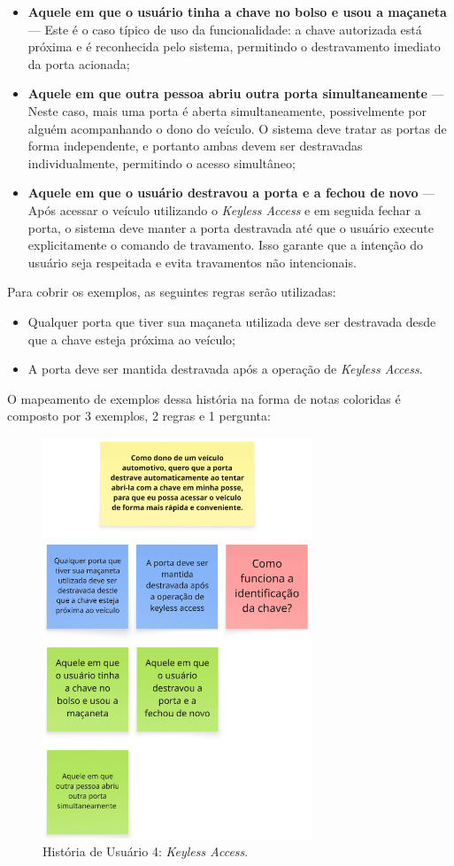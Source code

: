 \begin{itemize}
    \item \textbf{Aquele em que o usuário tinha a chave no bolso e usou a maçaneta} — Este é o caso típico de uso da funcionalidade: a chave autorizada está próxima e é reconhecida pelo sistema, permitindo o destravamento imediato da porta acionada;
    \item \textbf{Aquele em que outra pessoa abriu outra porta simultaneamente} — Neste caso, mais uma porta é aberta simultaneamente, possivelmente por alguém acompanhando o dono do veículo. O sistema deve tratar as portas de forma independente, e portanto ambas devem ser destravadas individualmente, permitindo o acesso simultâneo;
    \item \textbf{Aquele em que o usuário destravou a porta e a fechou de novo} — Após acessar o veículo utilizando o \textit{Keyless Access} e em seguida fechar a porta, o sistema deve manter a porta destravada até que o usuário execute explicitamente o comando de travamento. Isso garante que a intenção do usuário seja respeitada e evita travamentos não intencionais.
\end{itemize}

Para cobrir os exemplos, as seguintes regras serão utilizadas:

\begin{itemize}
    \item Qualquer porta que tiver sua maçaneta utilizada deve ser destravada desde que a chave esteja próxima ao veículo;
    \item A porta deve ser mantida destravada após a operação de \textit{Keyless Access}.
\end{itemize}

O mapeamento de exemplos dessa história na forma de notas coloridas é composto por 3 exemplos, 2 regras e 1 pergunta:

\begin{figure}[H]
\centering
\includegraphics[height=12cm]{figuras/user_story_4.png}
\caption{História de Usuário 4: \textit{Keyless Access}.}
\label{fig:historia4}
\end{figure}

